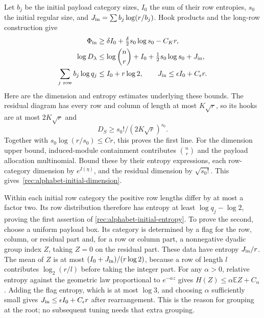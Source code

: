 Let $b_j$ be the initial payload category sizes, $I_0$ the sum of their row
entropies, $s_0$ the initial regular size, and
$J_{\rm in}=\sum b_j\log(r/b_j)$.  Hook products and the long-row
construction give
\begin{align}
 \Phi_{\rm in}&\ge\delta I_0+\tfrac\delta2s_0\log s_0-C_Kr,
       \label{rec:alphabet-initial-potential}\\
 \log D_\lambda&\le\log\binom nr+I_0+\tfrac12s_0\log s_0+J_{\rm in},
       \label{rec:alphabet-initial-dimension}\\
 \sum_{j\ \mathrm{row}}b_j\log q_j&\le I_0+r\log2,\qquad
 J_{\rm in}\le\epsilon I_0+C_\epsilon r.
       \label{rec:alphabet-initial-entropy}
\end{align}
Here are the dimension and entropy estimates underlying these bounds.
The residual diagram has every row and column of length at most
$K\sqrt r$, so its hooks are at most $2K\sqrt r$ and
\[
 D_S\ge s_0!/(2K\sqrt r)^{s_0}.
\]
Together with $s_0\log(r/s_0)\le Cr$, this proves the first line.
For the dimension upper bound, induced-module containment contributes
$\binom nr$ and the payload allocation multinomial.  Bound these by
their entropy expressions, each row-category dimension by
$e^{I(\eta)}$, and the residual dimension by $\sqrt{s_0!}$.
This gives~\eqref{rec:alphabet-initial-dimension}.

Within each initial row category the positive row lengths differ by at
most a factor two.  Its row distribution therefore has entropy at least
$\log q_j-\log2$, proving the first assertion of
\eqref{rec:alphabet-initial-entropy}.  To prove the second, choose a
uniform payload box.  Its category is determined by a flag for the row,
column, or residual part and, for a row or column part, a nonnegative
dyadic group index $Z$, taking $Z=0$ on the residual part.  These
data have entropy $J_{\rm in}/r$.
The mean of $Z$ is at most
$(I_0+J_{\rm in})/(r\log2)$, because a row of length $l$ contributes
$\log_2(r/l)$ before taking the integer part.  For any $\alpha>0$,
relative entropy against the geometric law proportional to
$e^{-\alpha z}$ gives $H(Z)\le\alpha\mathbb EZ+C_\alpha$.
Adding the flag entropy, which is at most $\log3$, and choosing
$\alpha$ sufficiently small gives
$J_{\rm in}\le\epsilon I_0+C_\epsilon r$ after rearrangement.
This is the reason for grouping at the root; no subsequent tuning needs
that extra grouping.

